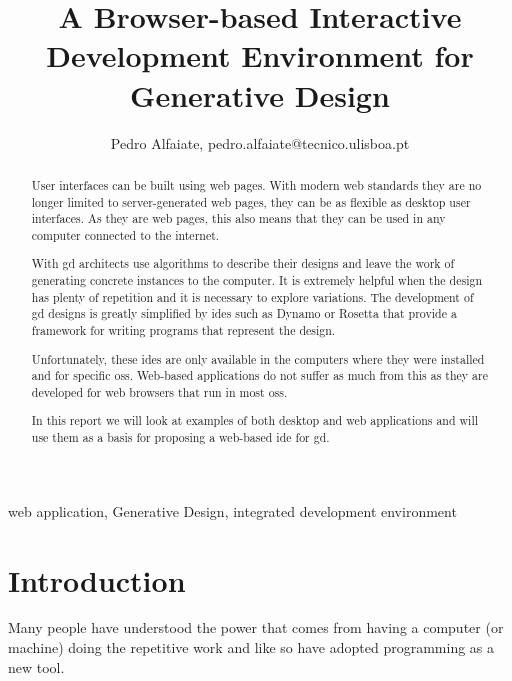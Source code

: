 \documentclass{./llncs2e/llncs}
\begin{document}
	
\setcounter{tocdepth}{2}
\makeatletter
\renewcommand*\l@author[2]{}
\renewcommand*\l@title[2]{}
\makeatother
	
	
\title{A Browser-based Interactive Development Environment for Generative Design}

\author{Pedro Alfaiate, pedro.alfaiate@tecnico.ulisboa.pt}

\maketitle

\begin{abstract}
	User interfaces can be built using web pages.
	With modern web standards they are no longer limited to server-generated web pages, they can be as flexible as desktop user interfaces.
	As they are web pages, this also means that they can be used in any computer connected to the internet.
	
	With \ac{gd} architects use algorithms to describe their designs and leave the work of generating concrete instances to the computer.
	It is extremely helpful when the design has plenty of repetition and it is necessary to explore variations.
	The development of \ac{gd} designs is greatly simplified by \acp{ide} such as Dynamo or Rosetta that provide a framework for writing programs that represent the design.

	Unfortunately, these \acp{ide} are only available in the computers where they were installed and for specific \acp{os}.
	Web-based applications do not suffer as much from this as they are developed for web browsers that run in most \acp{os}.

	In this report we will look at examples of both desktop and web applications and will use them as a basis for proposing a web-based \ac{ide} for \ac{gd}.
\end{abstract}
\begin{keywords}
web application, Generative Design, integrated development environment
\end{keywords}

\tableofcontents

\section{Introduction}
	Many people have understood the power that comes from having a computer (or machine) doing the repetitive work and like so have adopted programming as a new tool.
\end{document}
